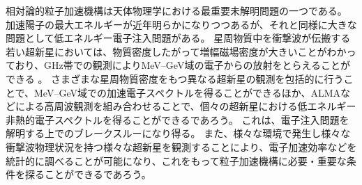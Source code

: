 相対論的粒子加速機構は天体物理学における最重要未解明問題の一つである。
加速陽子の最大エネルギーが近年明らかになりつつあるが、それと同様に大きな問題として低エネルギー電子注入問題がある。
星周物質中を衝撃波が伝搬する若い超新星においては、物質密度したがって増幅磁場密度が大きいことがわかっており、GHz帯での観測によりMeV--GeV域の電子からの放射をとらえることができる \citep{2013ApJ...762L..24M}。
さまざまな星周物質密度をもつ異なる超新星の観測を包括的に行うことで、MeV--GeV域での加速電子スペクトルを得ることができるほか、ALMAなどによる高周波観測を組み合わせることで、個々の超新星における低エネルギー非熱的電子スペクトルを得ることができるであろう。
これは、電子注入問題を解明する上でのブレークスルーになり得る。
また、様々な環境で発生し様々な衝撃波物理状況を持つ様々な超新星を観測することにより、電子加速効率などを統計的に調べることが可能になり、これをもって粒子加速機構に必要・重要な条件を探ることができるであろう。



